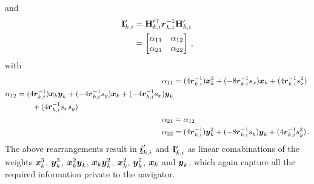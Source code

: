 \documentclass[twocolumn]{autart}
\begin{document}
and
\begin{equation}
    \begin{split}
        {\ensuremath{{\mathbf{I}}}}'_{k,i} &= {{\mathbf{H}}}_{k,i}^{\prime\top} {\boldsymbol{r}}_{k,i}^{-1}{{\mathbf{H}}}'_{k,i} \\
        &=
        \begin{bmatrix}
            \alpha_{11} & \alpha_{12} \\
            \alpha_{21} & \alpha_{22}
        \end{bmatrix}\,,
    \end{split} \label{eqn:hrh_linear_comb}
\end{equation}
with
\begin{align*}
    \alpha_{11} &= (4{\boldsymbol{r}}_{k,i}^{-1}){\boldsymbol{x}}_k^2 + (-8{\boldsymbol{r}}_{k,i}^{-1}s_x){\boldsymbol{x}}_k + (4{\boldsymbol{r}}_{k,i}^{-1}s_x^2) \\
    \begin{split}
        \alpha_{12} &= (4{\boldsymbol{r}}_{k,i}^{-1}){\boldsymbol{x}}_k{\boldsymbol{y}}_k + (-4{\boldsymbol{r}}_{k,i}^{-1}s_y){\boldsymbol{x}}_k + (-4{\boldsymbol{r}}_{k,i}^{-1}s_x){\boldsymbol{y}}_k \\
        &\qquad+ (4{\boldsymbol{r}}_{k,i}^{-1}s_xs_y)
    \end{split}\\
    \alpha_{21} &= \alpha_{12} \\
    \alpha_{22} &= (4{\boldsymbol{r}}_{k,i}^{-1}){\boldsymbol{y}}_k^2 + (-8{\boldsymbol{r}}_{k,i}^{-1}s_y){\boldsymbol{y}}_k + (4{\boldsymbol{r}}_{k,i}^{-1}s_y^2)\,.
\end{align*}
The above rearrangements result in ${\boldsymbol{\underline{i}}}'_{k,i}$ and ${{\mathbf{I}}}'_{k,i}$ as linear comabinations of the weights ${\boldsymbol{x}}_k^3$, ${\boldsymbol{y}}_k^3$, ${\boldsymbol{x}}_k^2{\boldsymbol{y}}_k$, ${\boldsymbol{x}}_k{\boldsymbol{y}}_k^2$, ${\boldsymbol{x}}_k^2$, ${\boldsymbol{y}}_k^2$, ${\boldsymbol{x}}_k$ and ${\boldsymbol{y}}_k$, which again capture all the required information private to the navigator.
\end{document}
